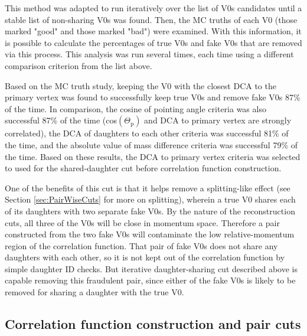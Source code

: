 This method was adapted to run iteratively over the list of V0s candidates until a stable list of non-sharing V0s was found.  Then, the MC truths of each V0 (those marked "good" and those marked "bad") were examined.  With this information, it is possible to calculate the percentages of true V0s and fake V0s that are removed via this process.  This analysis was run several times, each time using a different comparison criterion from the list above.

Based on the MC truth study, keeping the V0 with the closest DCA to the primary vertex was found to successfully keep true V0s and remove fake V0s 87\% of the time.  In comparison, the cosine of pointing angle criteria was also successful 87\% of the time (cos$(\Theta_\mathrm{p})$ and DCA to primary vertex are strongly correlated), the DCA of daughters to each other criteria was successful 81\% of the time, and the absolute value of mass difference criteria was successful 79\% of the time.   Based on these results, the DCA to primary vertex criteria was selected to used for the shared-daughter cut before correlation function construction.


One of the benefits of this cut is that it helps remove a splitting-like effect (see Section \ref{sec:PairWiseCuts} for more on splitting), wherein a true V0 shares each of its daughters with two separate fake V0s.  By the nature of the reconstruction cuts, all three of the V0s will be close in momentum space.  Therefore a pair constructed from the two fake V0s will contaminate the low relative-momentum region of the correlation function.  That pair of fake V0s does not share any daughters with each other, so it is not kept out of the correlation function by simple daughter ID checks.  But iterative daughter-sharing cut described above is capable removing this fraudulent pair, since either of the fake V0s is likely to be removed for sharing a daughter with the true V0.


\subsection{Correlation function construction and pair cuts}
\label{sec:CFconstruct}

